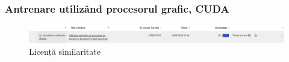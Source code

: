 \documentclass[a4paper, 12pt]{report}
\begin{document}
	\clearpage
	\subsubsection{Antrenare utilizând procesorul grafic, CUDA}
	
	\clearpage
   \printbibliography
   \clearpage
	\begin{figure}[H]
		\begin{center}
			\includegraphics[scale=0.4]{images/plagiat.PNG}
		\end{center}
		\caption{Licență similaritate }
		\label{fig:sim}
	\end{figure} 	
\end{document}
